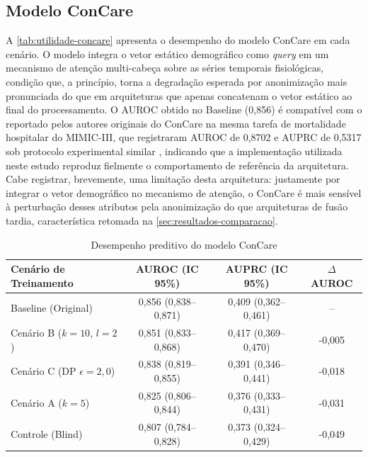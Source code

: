 \subsection{Modelo ConCare}
\label{sec:resultados-concare}

A \autoref{tab:utilidade-concare} apresenta o desempenho do modelo ConCare em cada cenário. O modelo integra o vetor estático demográfico como \textit{query} em um mecanismo de atenção multi-cabeça sobre as séries temporais fisiológicas, condição que, a princípio, torna a degradação esperada por anonimização mais pronunciada do que em arquiteturas que apenas concatenam o vetor estático ao final do processamento. O AUROC obtido no Baseline (0,856) é compatível com o reportado pelos autores originais do ConCare na mesma tarefa de mortalidade hospitalar do MIMIC-III, que registraram AUROC de 0,8702 e AUPRC de 0,5317 sob protocolo experimental similar \cite{Ma2020}, indicando que a implementação utilizada neste estudo reproduz fielmente o comportamento de referência da arquitetura. Cabe registrar, brevemente, uma limitação desta arquitetura: justamente por integrar o vetor demográfico no mecanismo de atenção, o ConCare é mais sensível à perturbação desses atributos pela anonimização do que arquiteturas de fusão tardia, característica retomada na \autoref{sec:resultados-comparacao}.

\begin{table}[ht]
\centering
\caption{Desempenho preditivo do modelo ConCare}
\label{tab:utilidade-concare}
\small
\setlength{\tabcolsep}{3pt}
\begin{tabular}{l|c|c|c}
\hline
\textbf{Cenário de Treinamento} & \textbf{AUROC (IC 95\%)} & \textbf{AUPRC (IC 95\%)} & \textbf{$\Delta$ AUROC} \\ \hline
Baseline (Original)             & 0,856 (0,838--0,871) & 0,409 (0,362--0,461) & --     \\ \hline
Cenário B ($k=10$, $l=2$)       & 0,851 (0,833--0,868) & 0,417 (0,369--0,470) & -0,005 \\
Cenário C (DP $\epsilon=2{,}0$) & 0,838 (0,819--0,855) & 0,391 (0,346--0,441) & -0,018 \\
Cenário A ($k=5$)               & 0,825 (0,806--0,844) & 0,376 (0,333--0,431) & -0,031 \\ \hline
Controle (Blind)                & 0,807 (0,784--0,828) & 0,373 (0,324--0,429) & -0,049 \\ \hline
\end{tabular}
\end{table}

